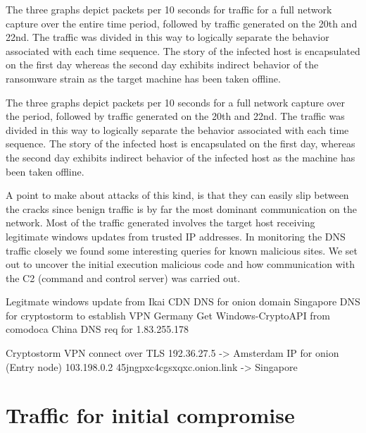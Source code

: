 \documentclass[11pt]{diazessay} %
\begin{document}
The three graphs depict packets per 10 seconds for traffic for a full network capture over the entire time period, followed by traffic generated on the 20th and 22nd. The traffic was divided in this way to logically separate the behavior associated with each time sequence. The story of the infected host is encapsulated on the first day whereas the second day exhibits indirect behavior of the ransomware strain as the target machine has been taken offline.  

The three graphs depict packets per 10 seconds for a full network capture over the period, followed by traffic generated on the 20th and 22nd. The traffic was divided in this way to logically separate the behavior associated with each time sequence. The story of the infected host is encapsulated on the first day, whereas the second day exhibits indirect behavior of the infected host as the machine has been taken offline.  

A point to make about attacks of this kind, is that they can easily slip between the cracks since benign traffic is by far the most dominant communication on the network. Most of the traffic generated involves the target host receiving legitimate windows updates from trusted IP addresses. In monitoring the DNS traffic closely we found some interesting queries for known malicious sites. We set out to uncover the initial execution malicious code and how communication with the C2 (command and control server) was carried out.

Legitmate windows update from Ikai CDN 
DNS for onion domain Singapore 
DNS for cryptostorm to establish VPN Germany
Get Windows-CryptoAPI from comodoca 
China DNS req  for 1.83.255.178 

Cryptostorm VPN connect over TLS 
192.36.27.5 -> Amsterdam IP for onion (Entry node)
103.198.0.2     45jngpxc4cgsxqxc.onion.link -> Singapore


\section{Traffic for initial compromise}
\end{document}
